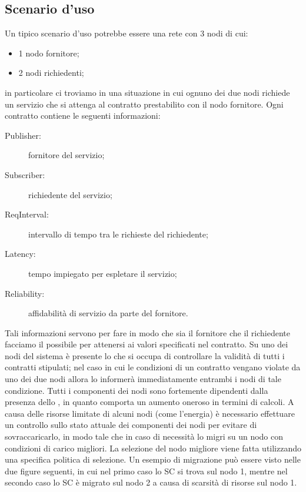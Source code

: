 \subsection{Scenario d'uso}
Un tipico scenario d'uso potrebbe essere una rete con 3 nodi di cui:
\begin{itemize}
\item 1 nodo fornitore;
\item 2 nodi richiedenti;
\end{itemize}
in particolare ci troviamo in una situazione in cui ognuno dei due nodi richiede un servizio che si attenga al contratto prestabilito con il nodo fornitore. Ogni contratto contiene le seguenti informazioni:
\begin{description}
\item[Publisher:] fornitore del servizio;
\item[Subscriber:] richiedente del servizio;
\item[ReqInterval:] intervallo di tempo tra le richieste del richiedente;
\item[Latency:] tempo impiegato per espletare il servizio;
\item[Reliability:] affidabilità di servizio da parte del fornitore.
\end{description}
Tali informazioni servono per fare in modo che sia il fornitore che il richiedente facciamo il possibile per attenersi ai valori specificati nel contratto.
Su uno dei nodi del sistema è presente lo  che si occupa di controllare la validità di tutti i contratti stipulati; nel caso in cui le condizioni di un contratto vengano violate da uno dei due nodi allora lo  informerà immediatamente entrambi i nodi di tale condizione. Tutti i componenti dei nodi sono fortemente dipendenti dalla presenza dello , in quanto comporta un aumento oneroso in termini di calcoli. A causa delle risorse limitate di alcuni nodi (come l'energia) è necessario effettuare un controllo sullo stato attuale dei componenti dei nodi per evitare di sovraccaricarlo, in modo tale che in caso di necessità lo  migri su un nodo con condizioni di carico migliori. La selezione del nodo migliore viene fatta utilizzando una specifica politica di selezione. Un esempio di migrazione può essere visto nelle due figure seguenti, in cui nel primo caso lo SC si trova sul nodo 1, mentre nel secondo caso lo SC è migrato sul nodo 2 a causa di scarsità di risorse sul nodo 1.
